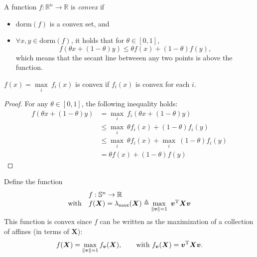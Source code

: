 \begin{definition}
A function $f:\mathbb{R}^n\to\mathbb{R}$ is \emph{convex} if
\begin{itemize}
\item
$\text{dorm}(f)$ is a convex set, and
\item
$\forall x,y\in\text{dorm}(f)$, 
it holds that for $\theta\in[0,1]$,
\[
f(
\theta x + (1-\theta) y
)
\le
\theta f(x) + (1-\theta) f(y),
\]
which means that the secant line betweeen any two points is above the function.
\end{itemize}
\end{definition}
\begin{proposition}
$f(x) = \max\limits_{i}~f_i(x)$ is convex if $f_i(x)$ is convex for each $i$.
\end{proposition}
\begin{proof}
For any $\theta\in[0,1]$, the following inequality holds:
\begin{align*}
f(\theta x + (1-\theta)y) &=\max\limits_{i}~f_i(\theta x + (1-\theta)y)\\
&\le \max\limits_{i}~\theta f_i(x) + (1-\theta)f_i(y)\\
&\le \max\limits_{i}~\theta f_i(x) +  \max\limits_{i}~(1-\theta)f_i(y)\\
&=\theta f(x) + (1-\theta)f(y)
\end{align*}
\end{proof}
\begin{example}
Define the function
\[
\begin{array}{ll}
&f:\mathbb{S}^n\to\mathbb{R}\\
\mbox{with}&f(\bm X)=\lambda_{\max}(\bm X)\triangleq\max\limits_{\|\bm v\|=1}~\bm v^{\mathrm T}\bm X\bm v
\end{array}
\]
This function is convex since $f$ can be written as the maximization of a collection of affines (in terms of $\bm X$):
\[
f(\bm X) = \max_{\|\bm v\|=1}f_{\bm v}(\bm X),\qquad
\text{with }f_{\bm v}(\bm X)=\bm v^{\mathrm T}\bm X\bm v.
\]
\end{example}
















